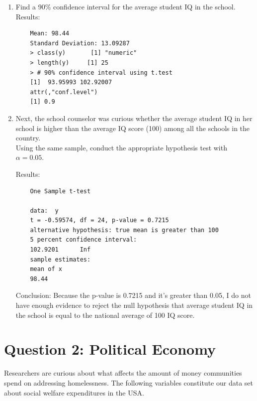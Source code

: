 \documentclass[12pt,letterpaper]{article}
\begin{document}
\begin{enumerate}
	\item Find a 90\% confidence interval for the average student IQ in the school.\\
	
	  
	
	Results:
	
	\begin{verbatim}
	Mean: 98.44 
	Standard Deviation: 13.09287 
	> class(y)    	 [1] "numeric"
	> length(y) 	[1] 25
	> # 90% confidence interval using t.test
	[1]  93.95993 102.92007
	attr(,"conf.level")
	[1] 0.9
	\end{verbatim}
	
	
	
	
	\vspace{.1cm}
	
	\item Next, the school counselor was curious  whether  the average student IQ in her school is higher than the average IQ score (100) among all the schools in the country.\\ 
	
	\noindent Using the same sample, conduct the appropriate hypothesis test with $\alpha=0.05$.

\vspace{.1cm}

  


Results:

\begin{verbatim}
	One Sample t-test
	
	data:  y
	t = -0.59574, df = 24, p-value = 0.7215
	alternative hypothesis: true mean is greater than 100
	5 percent confidence interval:
	102.9201      Inf
	sample estimates:
	mean of x 
	98.44 
\end{verbatim}



	\vspace{.1cm}
Conclusion:
Because the p-value is 0.7215 and it's greater than 0.05, I do not have enough evidence to reject the null hypothesis that average student IQ in the school is equal to the national average of 100 IQ score.


\end{enumerate}

	\vspace{.5cm}


	\section*{Question 2: Political Economy}
	\vspace{.2cm}
\noindent Researchers are curious about what affects the amount of money communities spend on addressing homelessness. The following variables constitute our data set about social welfare expenditures in the USA. \\
\vspace{.5cm}
\end{document}
